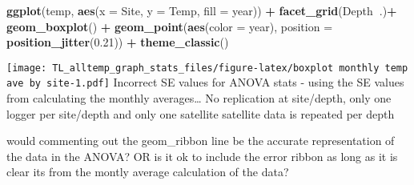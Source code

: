 \documentclass[
]{article}
\newenvironment{Shaded}{\begin{snugshade}}{\end{snugshade}}
\newcommand{\DataTypeTok}[1]{\textcolor[rgb]{0.13,0.29,0.53}{#1}}
\newcommand{\FloatTok}[1]{\textcolor[rgb]{0.00,0.00,0.81}{#1}}
\newcommand{\KeywordTok}[1]{\textcolor[rgb]{0.13,0.29,0.53}{\textbf{#1}}}
\newcommand{\NormalTok}[1]{#1}
\newcommand{\OperatorTok}[1]{\textcolor[rgb]{0.81,0.36,0.00}{\textbf{#1}}}
\newcommand{\StringTok}[1]{\textcolor[rgb]{0.31,0.60,0.02}{#1}}
\begin{document}
\begin{Shaded}
\begin{Highlighting}[]
\KeywordTok{ggplot}\NormalTok{(temp, }\KeywordTok{aes}\NormalTok{(}\DataTypeTok{x =}\NormalTok{ Site, }\DataTypeTok{y =}\NormalTok{ Temp, }\DataTypeTok{fill =}\NormalTok{ year)) }\OperatorTok{+}
\StringTok{   }\KeywordTok{facet_grid}\NormalTok{(Depth}\OperatorTok{~}\NormalTok{.)}\OperatorTok{+}
\StringTok{    }\KeywordTok{geom_boxplot}\NormalTok{() }\OperatorTok{+}
\StringTok{   }\KeywordTok{geom_point}\NormalTok{(}\KeywordTok{aes}\NormalTok{(}\DataTypeTok{color =}\NormalTok{ year), }\DataTypeTok{position =} \KeywordTok{position_jitter}\NormalTok{(}\FloatTok{0.21}\NormalTok{)) }\OperatorTok{+}
\StringTok{    }\KeywordTok{theme_classic}\NormalTok{()}
\end{Highlighting}
\end{Shaded}

\texttt{[image: TL\_alltemp\_graph\_stats\_files/figure-latex/boxplot monthly temp ave by site-1.pdf]}
Incorrect SE values for ANOVA stats - using the SE values from
calculating the monthly averages\ldots{} No replication at site/depth,
only one logger per site/depth and only one satellite satellite data is
repeated per depth

would commenting out the geom\_ribbon line be the accurate
representation of the data in the ANOVA? OR is it ok to include the
error ribbon as long as it is clear its from the montly average
calculation of the data?
\end{document}
